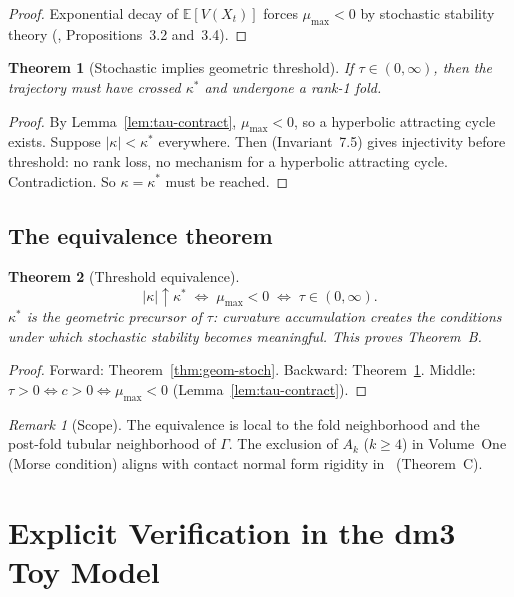 \documentclass[12pt]{article}
\numberwithin{equation}{section}
\newtheorem{theorem}{Theorem}[section]
\theoremstyle{remark}
\newtheorem{remark}{Remark}[section]
\newcommand{\Orb}{\Gamma}
\begin{document}
\begin{proof}
Exponential decay of $\mathbb{E}[V(X_t)]$ forces $\mu_{\max}<0$
by stochastic stability theory
(\cite{Paper1}, Propositions~3.2 and~3.4).
\end{proof}

\begin{theorem}[Stochastic implies geometric threshold]
\label{thm:stoch-geom}
If $\tau\in(0,\infty)$, then the trajectory must have crossed
$\kappa^*$ and undergone a rank-1 fold.
\end{theorem}

\begin{proof}
By Lemma~\ref{lem:tau-contract}, $\mu_{\max}<0$, so a hyperbolic
attracting cycle exists. Suppose $|\kappa|<\kappa^*$ everywhere.
Then \cite{PO1} (Invariant~7.5) gives injectivity before threshold:
no rank loss, no mechanism for a hyperbolic attracting cycle.
Contradiction. So $\kappa=\kappa^*$ must be reached.
\end{proof}

\subsection{The equivalence theorem}

\begin{theorem}[Threshold equivalence]
\label{thm:equiv}
\[
  |\kappa|\uparrow\kappa^*
  \;\iff\;
  \mu_{\max}<0
  \;\iff\;
  \tau\in(0,\infty).
\]
$\kappa^*$ is the geometric precursor of $\tau$: curvature
accumulation creates the conditions under which stochastic
stability becomes meaningful. This proves Theorem~B.
\end{theorem}

\begin{proof}
Forward: Theorem~\ref{thm:geom-stoch}.
Backward: Theorem~\ref{thm:stoch-geom}.
Middle: $\tau>0\iff c>0\iff\mu_{\max}<0$
(Lemma~\ref{lem:tau-contract}).
\end{proof}

\begin{remark}[Scope]
The equivalence is local to the fold neighborhood and the
post-fold tubular neighborhood of $\Orb$. The exclusion of
$A_k$ ($k\ge 4$) in Volume~One (Morse condition) aligns with
contact normal form rigidity in~\cite{Paper1} (Theorem~C).
\end{remark}

\section{Explicit Verification in the dm3 Toy Model}
\label{sec:verification}
\end{document}
